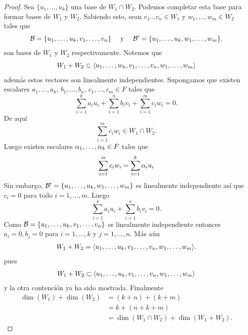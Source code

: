 \documentclass[12pt,a4paper]{book}
\begin{document}
    \begin{proof}
        Sea $\{u_{1},\dots,u_{k}\}$ una base de $W_{1}\cap W_{2}$. Podemos completar esta
        base para formar bases de $W_{1}$ y $W_{2}$. Sabiendo esto, sean $v_{1}\dots v_{n}\in W_{1}$
        y $w_{1},\dots,w_{m}\in W_{2}$ tales que
        \begin{equation*}
            \mathcal{B}=\{u_{1},\dots,u_{k},v_{1},\dots,v_{n}\}\quad\text{ y }\quad\mathcal{B}^{\prime}=\{u_{1},\dots,u_{k},w_{1},\dots,w_{m}\}.
        \end{equation*}
        son bases de $W_{1}$ y $W_{2}$ respectivamente. Notemos que
        \begin{equation*}
            W_{1}+W_{2}\subset\langle u_{1},\dots,w_{k},v_{1},\dots,v_{n},w_{1},\dots,w_{m} \rangle
        \end{equation*}
        además estos vectores son linealmente independientes. Supongamos que existen escalares
        $a_{1},\dots,a_{k}$, $b_{1},\dots,b_{n}$, $c_{1},\dots,c_{m}\in F$ tales que
        \begin{equation*}
            \sum_{i=1}^{k}a_{i}u_{i}+\sum_{i=1}^{n}b_{i}v_{i}+\sum_{i=1}^{m}c_{i}w_{i}=0.
        \end{equation*}
        De aquí
        \begin{equation*}
            \sum_{i=1}^{m}c_{i}w_{i}\in W_{1}\cap W_{2}.
        \end{equation*}
        Luego existen escalares $\alpha_{1},\dots,\alpha_{k}\in F$ tales que
        \begin{equation*}
            \sum_{i=1}^{m}c_{i}w_{i}=\sum_{i=1}^{k}\alpha_{i}u_{i}
        \end{equation*}
        Sin embargo, $\mathcal{B}^{\prime}=\{u_{1},\dots,u_{k},w_{1},\dots,w_{m}\}$ es linealmente independiente
        así que $c_{i}=0$ para todo $i=1,\dots,m$. Luego
        \begin{equation*}
            \sum_{i=1}^{k}a_{i}u_{i}+\sum_{i=1}^{n}b_{i}v_{i}=0.
        \end{equation*}
        Como $\mathcal{B}=\{u_{1},\dots,u_{k},v_{1},\dots,v_{n}\}$ es linealmente independiente entonces
        $a_{i}=0,b_{j}=0$ para $i=1,\dots,k$ y $j=1,\dots,n$. Más aún
        \begin{equation*}
            W_{1}+W_{2}=\langle u_{1},\dots,u_{k},v_{1},\dots,v_{n},w_{1},\dots,w_{m} \rangle.
        \end{equation*}
        pues
        \begin{equation*}
            W_{1}+W_{2}\subset\langle u_{1},\dots,u_{k},v_{1},\dots,v_{n},w_{1},\dots,w_{m} \rangle
        \end{equation*}
        y la otra contención ya ha sido mostrada. Finalmente
        \begin{align*}
            \dim(W_{1})+\dim(W_{2})&=(k+n)+(k+m)\\
            &=k+(n+k+m)\\
            &=\dim(W_{1}\cap W_{2})+\dim(W_{1}+W_{2}).
        \end{align*}
    \end{proof}
\end{document}
